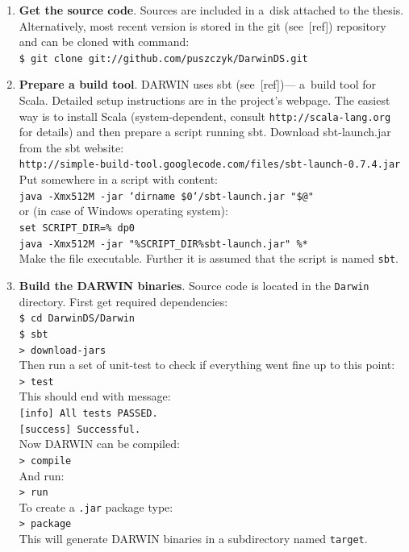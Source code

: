\begin{enumerate}

\item \textbf{Get the source code}. Sources are included in a~disk attached to
  the thesis. Alternatively, most recent version is stored in the git
  (see~[ref]) repository and can be cloned with command:\\
  \texttt{\$ git clone git://github.com/puszczyk/DarwinDS.git}
\item \textbf{Prepare a build tool}. DARWIN uses sbt (see~[ref])--- a~build
  tool for Scala. Detailed setup instructions are in the project's
  webpage. The easiest way is to install Scala (system-dependent, consult
  \texttt{http://scala-lang.org} for details) and then prepare a script
  running sbt. Download sbt-launch.jar from the sbt website: \\
  \texttt{http://simple-build-tool.googlecode.com/files/sbt-launch-0.7.4.jar}
  \\
  Put somewhere in  a script with content: \\
  \texttt{java -Xmx512M -jar `dirname \$0`/sbt-launch.jar "\$@"} \\
  or (in case of Windows operating system): \\
  \texttt{set SCRIPT\_DIR=\%~dp0} \\
  \texttt{java -Xmx512M -jar "\%SCRIPT\_DIR\%sbt-launch.jar" \%*} \\
  Make the file executable. Further it is assumed that the script is named
  \texttt{sbt}.
\item \textbf{Build the DARWIN binaries}. Source code is located in the
  \texttt{Darwin} directory. First get required dependencies: \\
  \texttt{\$ cd DarwinDS/Darwin} \\
  \texttt{\$ sbt} \\
  \texttt{> download-jars} \\
  Then run a set of unit-test to check if everything went fine up to this
  point:\\
  \texttt{> test} \\
  This should end with message: \\
  \texttt{[info] All tests PASSED.} \\
  \texttt{[success] Successful.} \\
  Now DARWIN can be compiled: \\
  \texttt{> compile} \\
  And run: \\
  \texttt{> run} \\
  To create a \texttt{.jar} package type: \\
  \texttt{> package} \\
  This will generate DARWIN binaries in a subdirectory named \texttt{target}.
\end{enumerate}


